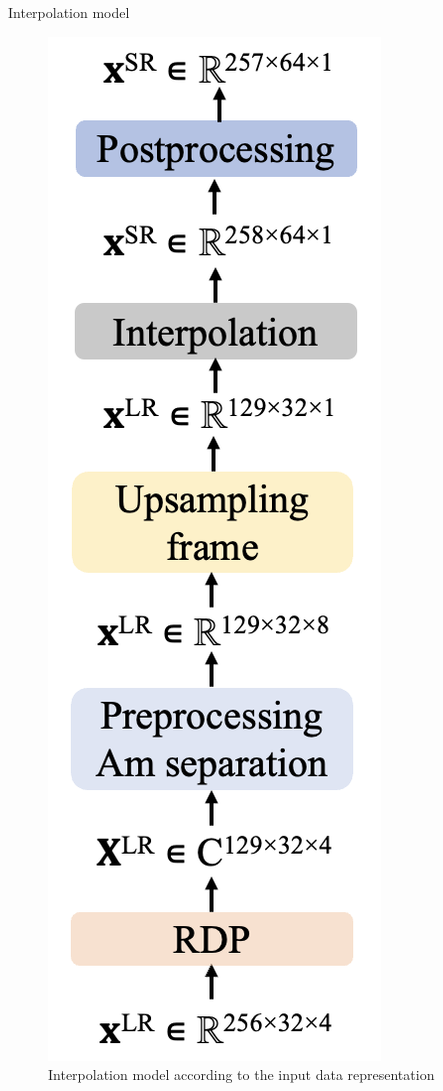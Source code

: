 \documentclass{beamer}
\begin{document}
\begin{frame}[t]{Interpolation model}
\begin{figure}
\begin{minipage}{0.39\textwidth}
            \includegraphics[height=1.6\textwidth]{MA_presentation/figures/interpolation_right.png}
        \end{minipage}
        \caption{Interpolation model according to the input data representation}
    \end{figure}

\end{frame}
\end{document}
